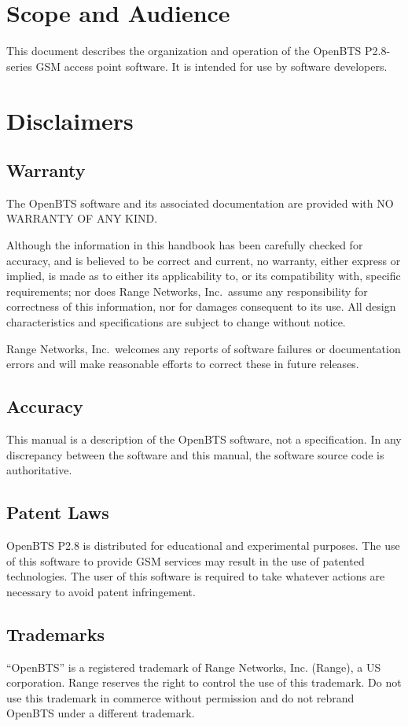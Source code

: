 \documentclass[11pt,openany]{book}
\begin{document}
\section{Scope and Audience}
This document describes the organization and operation of the OpenBTS P2.8-series GSM access point software.  It is intended for use by software developers.

\section{Disclaimers}

\subsection{Warranty}
The OpenBTS software and its associated documentation are provided with NO WARRANTY OF ANY KIND.  

Although the information in this handbook has been carefully checked for accuracy, and is believed to be correct and current, no warranty, either express or implied, is made as to either its applicability to, or its compatibility with, specific requirements; nor does Range Networks, Inc.\ assume any responsibility for correctness of this information, nor for damages consequent to its use. All design characteristics and specifications are subject to change without notice.

Range Networks, Inc.\ welcomes any reports of software failures or documentation errors and will make reasonable efforts to correct these in future releases.

\subsection{Accuracy}
This manual is a description of the OpenBTS software, not a specification.
In any discrepancy between the software and this manual, the software source code is authoritative.

\subsection{Patent Laws}
OpenBTS P2.8 is distributed for educational and experimental purposes.
The use of this software to provide GSM services may result in the use of
patented technologies.  The user of this software is required to take whatever
actions are necessary to avoid patent infringement.

\subsection{Trademarks}
``OpenBTS'' is a registered trademark of Range Networks, Inc. (Range), a US corporation.
Range reserves the right to control the use of this trademark.
Do not use this trademark in commerce without permission and do not rebrand OpenBTS under a different trademark.
\end{document}
